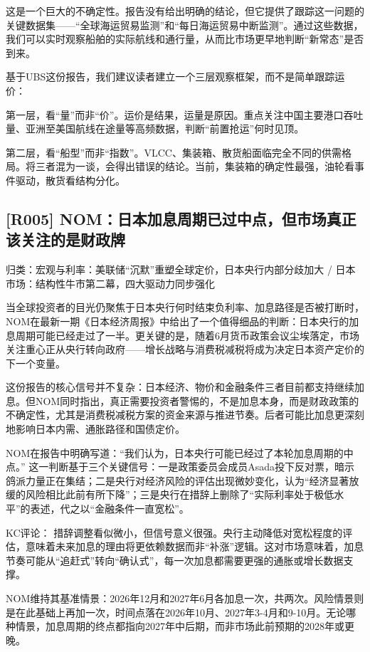\documentclass[11pt]{ctexart}
\begin{document}
这是一个巨大的不确定性。报告没有给出明确的结论，但它提供了跟踪这一问题的关键数据集——“全球海运贸易监测”和“每日海运贸易中断监测”。通过这些数据，我们可以实时观察船舶的实际航线和通行量，从而比市场更早地判断“新常态”是否到来。

基于UBS这份报告，我们建议读者建立一个三层观察框架，而不是简单跟踪运价：

第一层，看“量”而非“价”。运价是结果，运量是原因。重点关注中国主要港口吞吐量、亚洲至美国航线在途量等高频数据，判断“前置抢运”何时见顶。

第二层，看“船型”而非“指数”。VLCC、集装箱、散货船面临完全不同的供需格局。将三者混为一谈，会得出错误的结论。当前，集装箱的确定性最强，油轮看事件驱动，散货看结构分化。

\subsection{[R005] NOM：日本加息周期已过中点，但市场真正该关注的是财政牌}
{\small\color{refgray}归类：宏观与利率：美联储“沉默”重塑全球定价，日本央行内部分歧加大 / 日本市场：结构性牛市第二幕，四大驱动力同步强化}

当全球投资者的目光仍聚焦于日本央行何时结束负利率、加息路径是否被打断时，NOM在最新一期《日本经济周报》中给出了一个值得细品的判断：日本央行的加息周期可能已经走过了一半。更关键的是，随着6月货币政策会议尘埃落定，市场关注重心正从央行转向政府——增长战略与消费税减税将成为决定日本资产定价的下一个变量。

这份报告的核心信号并不复杂：日本经济、物价和金融条件三者目前都支持继续加息。但NOM同时指出，真正需要投资者警惕的，不是加息本身，而是财政政策的不确定性，尤其是消费税减税方案的资金来源与推进节奏。后者可能比加息更深刻地影响日本内需、通胀路径和国债定价。

NOM在报告中明确写道：“我们认为，日本央行可能已经过了本轮加息周期的中点。” 这一判断基于三个关键信号：一是政策委员会成员Asada投下反对票，暗示鸽派力量正在集结；二是央行对经济风险的评估出现微妙变化，认为“经济显著放缓的风险相比此前有所下降”；三是央行在措辞上删除了“实际利率处于极低水平”的表述，代之以“金融条件一直宽松”。

KC评论： 措辞调整看似微小，但信号意义很强。央行主动降低对宽松程度的评估，意味着未来加息的理由将更依赖数据而非“补涨”逻辑。这对市场意味着，加息节奏可能从“追赶式”转向“确认式”，每一次加息都需要更强的通胀或增长数据支撑。

NOM维持其基准情景：2026年12月和2027年6月各加息一次，共两次。风险情景则是在此基础上再加一次，时间点落在2026年10月、2027年3-4月和9-10月。无论哪种情景，加息周期的终点都指向2027年中后期，而非市场此前预期的2028年或更晚。
\end{document}
